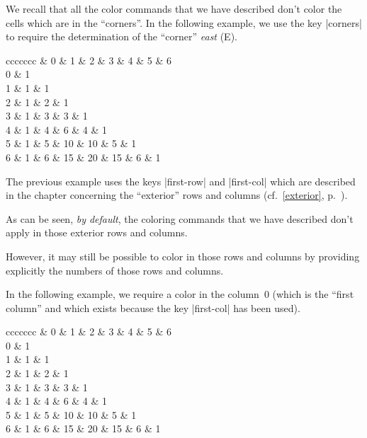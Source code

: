 \documentclass[dvipsnames]{article}
\let\myrlap\rlap
\begin{document}
\vspace{1cm}
We recall that all the color commands that we have described don't color the cells
which are in the ``corners''. In the following example, we use the key
|corners| to require the determination of the ``corner'' \emph{east} (E).

\medskip
{}
\begin{Code}[width=9cm,show-output]
\begin{NiceTabular}{ccccccc}\myrlap{[\emph{corners=E},margin,hvlines,first-row,first-col]}
\CodeBefore
  \emph{}
\Body
    & 0 & 1 & 2 & 3 & 4 & 5 & 6 \\
  0 & 1 \\
  1 & 1 & 1 \\
  2 & 1 & 2 & 1 \\
  3 & 1 & 3 & 3 & 1 \\
  4 & 1 & 4 & 6 & 4 & 1 \\
  5 & 1 & 5 & 10 & 10 & 5 & 1 \\
  6 & 1 & 6 & 15 & 20 & 15 & 6 & 1 \\
\end{NiceTabular}
\end{Code}

\medskip
The previous example uses the keys |first-row| and |first-col| which are
described in the chapter concerning the ``exterior'' rows and columns
(cf.~\ref{exterior}, p.~\pageref{exterior}). 

As can be seen, \emph{by default}, the coloring commands that we have described
don't apply in those exterior rows and columns.

However, it may still be possible to color in those rows and columns by
providing explicitly the numbers of those rows and columns.

In the following example, we require a color in the column~$0$ (which is the
``first column'' and which exists because the key |first-col| has been used).

\medskip
\begin{Code}[width=9cm,show-output]
\begin{NiceTabular}{ccccccc}\myrlap{[\emph{corners=E},margin,hvlines,first-row,first-col]}
\CodeBefore
  \emph{}
\Body
    & 0 & 1 & 2 & 3 & 4 & 5 & 6 \\
  0 & 1 \\
  1 & 1 & 1 \\
  2 & 1 & 2 & 1 \\
  3 & 1 & 3 & 3 & 1 \\
  4 & 1 & 4 & 6 & 4 & 1 \\
  5 & 1 & 5 & 10 & 10 & 5 & 1 \\
  6 & 1 & 6 & 15 & 20 & 15 & 6 & 1 \\
\end{NiceTabular}
\end{Code}
\end{document}
